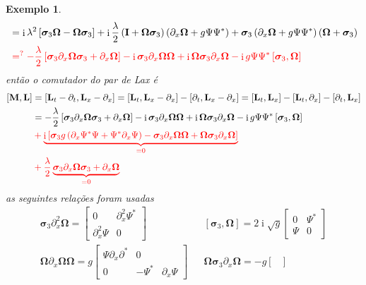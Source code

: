 \documentclass[25pt]{article}
\numberwithin{equation}{subsection} %
\DeclareMathOperator{\I}{i}
\newtheorem{expl}{Exemplo}
\newcommand{\commutador}[2]{\left[#1,#2\right]}
\newcommand{\OP}[1]{\mathbf{#1}}
\begin{document}
\begin{expl}
\begin{align}
&=\I\lambda^2\left[\bm{\sigma}_3\bm{\Omega}-\bm{\Omega}\bm{\sigma}_3\right]+\I\frac{\lambda}{2}\left(\OP{I}+\bm{\Omega}\bm{\sigma}_3\right)\left(\partial_x\bm{\Omega}+g\Psi\Psi^*\right)+\bm{\sigma}_3\left(\partial_x\bm{\Omega}+g\Psi\Psi^*\right)\left(\bm{\Omega}+\bm{\sigma}_3\right)\\
&\color{red}=^{?}-\frac{\lambda}{2}\left[\bm{\sigma}_3\partial_x\bm{\Omega}\bm{\sigma}_3+\partial_x\bm{\Omega}\right]-\I\bm{\sigma}_3\partial_x\bm{\Omega}\bm{\Omega}+\I\bm{\Omega}\bm{\sigma}_3\partial_x\bm{\Omega}-\I g\Psi\Psi^*\commutador{\bm{\sigma}_3}{\bm{\Omega}}\color{black}
\end{align}
então o comutador do par de Lax é
\begin{align}
\commutador{\OP{M}}{\OP{L}}&=\commutador{\OP{L}_t-\partial_t}{\OP{L}_x-\partial_x}=\commutador{\OP{L}_t}{\OP{L}_x-\partial_x}-\commutador{\partial_t}{\OP{L}_x-\partial_x}=\commutador{\OP{L}_t}{\OP{L}_x}-\commutador{\OP{L}_t}{\partial_x}-\commutador{\partial_t}{\OP{L}_x}\\
&=-\frac{\lambda}{2}\left[\bm{\sigma}_3\partial_x\bm{\Omega}\bm{\sigma}_3+\partial_x\bm{\Omega}\right]-\I\bm{\sigma}_3\partial_x\bm{\Omega}\bm{\Omega}+\I\bm{\Omega}\bm{\sigma}_3\partial_x\bm{\Omega}-\I g\Psi\Psi^*\commutador{\bm{\sigma}_3}{\bm{\Omega}}\\
&\color{red} +\underbrace{\I\left[\bm{\sigma}_3g\left(\partial_x\Psi^{*}\Psi+\Psi^{*}\partial_x\Psi\right)-\bm{\sigma}_3\partial_x\bm{\Omega}\bm{\Omega}+\bm{\Omega}\bm{\sigma}_3\partial_x\bm{\Omega}\right]}_{=0}\nonumber\\
&\color{red}+\frac{\lambda}{2}\underbrace{\bm{\sigma}_3\partial_x\bm{\Omega}\bm{\sigma}_3+\partial_x\bm{\Omega}}_{=0}\nonumber
\end{align}
as seguintes relações foram usadas
\begin{align*}
\bm{\sigma}_3\partial_x^2\bm{\Omega}=\begin{bmatrix}
0&\partial_x^2\Psi^{*}\\
\partial_x^2\Psi&0
\end{bmatrix}&&\commutador{\bm{\sigma}_3}{\bm{\Omega}}=2\I\sqrt{g}\begin{bmatrix}
0&\Psi^*\\
\Psi&0
\end{bmatrix}\\
\bm{\Omega}\partial_x\bm{\Omega}\bm{\Omega}=g\begin{bmatrix}
\Psi\partial_x\partial^*&0\\
0&-\Psi^*&\partial_x\Psi
\end{bmatrix}&&\bm{\Omega}\bm{\sigma}_3\partial_x\bm{\Omega}=-g\begin{bmatrix}

\end{bmatrix}
\end{align*}
\end{expl}
\end{document}
